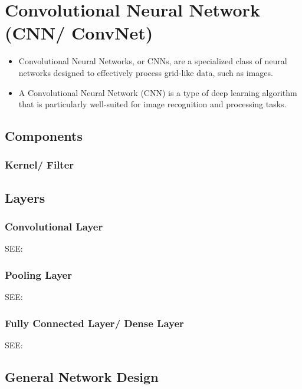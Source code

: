 \chapter{Convolutional Neural Network (CNN/ ConvNet) \cite{gfg-convolutional-neural-network-cnn-in-machine-learning}}\label{Convolutional Neural Network}

\begin{itemize}
    \item Convolutional Neural Networks, or CNNs, are a specialized class of neural networks designed to effectively process grid-like data, such as images.

    \item A Convolutional Neural Network (CNN) is a type of deep learning algorithm that is particularly well-suited for image recognition and processing tasks.
\end{itemize}


\section{Components}
\subsection{Kernel/ Filter}


\section{Layers}
\subsection{Convolutional Layer}

SEE: 


\subsection{Pooling Layer}

SEE: 


\subsection{Fully Connected Layer/ Dense Layer}
SEE: 



\section{General Network Design \cite{gfg-convolutional-neural-network-cnn-in-machine-learning}}\label{cnn: General Network Design}

